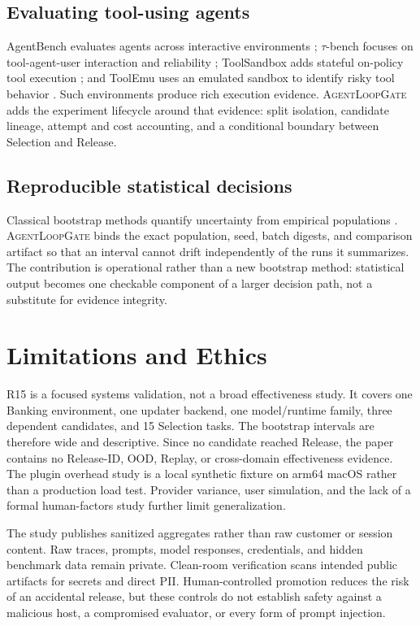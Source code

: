 \documentclass[10pt,twocolumn]{article}
\newcommand{\system}{\textsc{AgentLoopGate}\xspace}
\begin{document}
\subsection{Evaluating tool-using agents}

AgentBench evaluates agents across interactive environments
\cite{liu2023agentbench}; $\tau$-bench focuses on tool-agent-user interaction
and reliability \cite{yao2024taubench}; ToolSandbox adds stateful on-policy
tool execution \cite{lu2024toolsandbox}; and ToolEmu uses an emulated sandbox
to identify risky tool behavior \cite{ruan2023toolemu}. Such environments
produce rich execution evidence. \system adds the experiment lifecycle around
that evidence: split isolation, candidate lineage, attempt and cost accounting,
and a conditional boundary between Selection and Release.

\subsection{Reproducible statistical decisions}

Classical bootstrap methods quantify uncertainty from empirical populations
\cite{efron1979bootstrap}. \system binds the exact population, seed, batch
digests, and comparison artifact so that an interval cannot drift independently
of the runs it summarizes. The contribution is operational rather than a new
bootstrap method: statistical output becomes one checkable component of a
larger decision path, not a substitute for evidence integrity.

\section{Limitations and Ethics}

R15 is a focused systems validation, not a broad effectiveness study. It covers
one Banking environment, one updater backend, one model/runtime family, three
dependent candidates, and 15 Selection tasks. The bootstrap intervals are
therefore wide and descriptive. Since no candidate reached Release, the paper
contains no Release-ID, OOD, Replay, or cross-domain effectiveness evidence.
The plugin overhead study is a local synthetic fixture on arm64 macOS rather
than a production load test. Provider variance, user simulation, and the lack
of a formal human-factors study further limit generalization.

The study publishes sanitized aggregates rather than raw customer or session
content. Raw traces, prompts, model responses, credentials, and hidden
benchmark data remain private. Clean-room verification scans intended public
artifacts for secrets and direct PII. Human-controlled promotion reduces the
risk of an accidental release, but these controls do not establish safety
against a malicious host, a compromised evaluator, or every form of prompt
injection.
\end{document}
